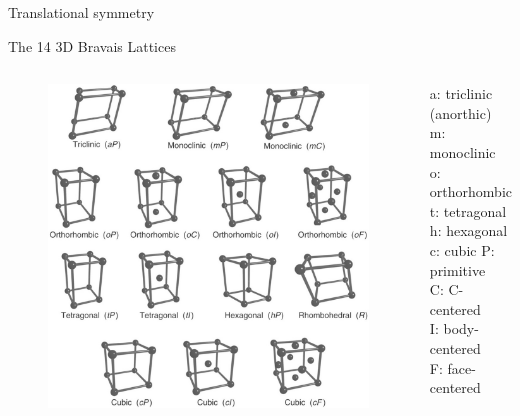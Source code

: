 \documentclass[aspectratio=169]{beamer}
\begin{document}
\begin{frame}{Translational symmetry}
\end{frame} 


\begin{frame}{The 14 3D Bravais Lattices}
\begin{columns}
\begin{figure}
    \centering
    \includegraphics[width=0.6\linewidth]{lectures/figures/7_bravais_lattices.jpg}
\end{figure}
a: triclinic (anorthic)\\
m: monoclinic\\
o: orthorhombic\\
t: tetragonal\\
h: hexagonal\\
c: cubic\newline
\newline
P: primitive\\
C: C-centered\\
I: body-centered\\
F: face-centered
\end{columns}

\end{frame} 
\end{document}
